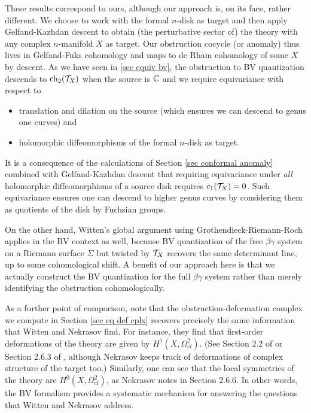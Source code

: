 These results correspond to ours,
although our approach is, on its face, rather different.
We choose to work with the formal $n$-disk as target 
and then apply Gelfand-Kazhdan descent to obtain (the perturbative sector of) the theory with any complex $n$-manifold $X$ as target.
Our obstruction cocycle (or anomaly) thus lives in Gelfand-Fuks cohomology
and maps to de Rham cohomology of some $X$ by descent.
As we have seen in \ref{sec equiv bv}, the obstruction to BV quantization descends to ${\rm ch}_2(\mathcal T_X)$ when the source is $\mathbb C$ 
and we require equivariance with respect to
\begin{itemize}
\item translation and dilation on the source (which ensures we can descend to genus one curves) and
\item holomorphic diffeomorphisms of the formal $n$-disk as target.
\end{itemize}
It is a consequence of the calculations of Section \ref{sec conformal anomaly} combined with Gelfand-Kazhdan descent that requiring equivariance under {\em all} holomorphic diffeomorphisms of a source disk requires $c_1(\mathcal T_X) = 0$.
Such equivariance ensures one can descend to higher genus curves by considering them as quotients of the disk by Fuchsian groups.

\begin{rmk}
On the other hand, Witten's global argument using Grothendieck-Riemann-Roch applies in the BV context as well,
because BV quantization of the free $\beta\gamma$ system 
on a Riemann surface $\Sigma$ but twisted by $\mathcal T_X$ recovers the same determinant line, 
up to some cohomological shift.
A benefit of our approach here is that we actually construct the BV quantization for the full $\beta\gamma$ system
rather than merely identifying the obstruction cohomologically.
\end{rmk}

As a further point of comparison, note that the obstruction-deformation complex we compute in Section \ref{sec eq def cplx} recovers precisely the same information that Witten and Nekrasov find.
For instance, they find that first-order deformations of the theory are given by $H^1(X, \Omega^2_{cl})$.
(See Section 2.2 of \cite{WittenCDO} or Section 2.6.3 of \cite{Nek}, although Nekrasov keeps track of deformations of complex structure of the target too.)
Similarly, one can see that the local symmetries of the theory are $H^0(X, \Omega^2_{cl})$, as Nekrasov notes in Section 2.6.6.
In other words, the BV formalism provides a systematic mechanism for answering the questions that Witten and Nekrasov address.

